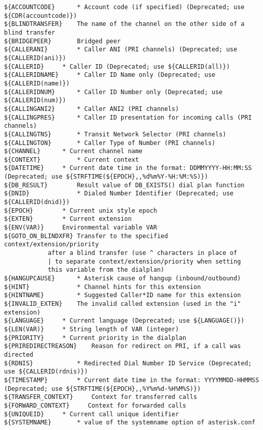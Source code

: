\begin{verbatim}
${ACCOUNTCODE} 	 	* Account code (if specified) (Deprecated; use ${CDR(accountcode)})
${BLINDTRANSFER} 	The name of the channel on the other side of a blind transfer
${BRIDGEPEER}	 	Bridged peer
${CALLERANI}	 	* Caller ANI (PRI channels) (Deprecated; use ${CALLERID(ani)})
${CALLERID}	 	* Caller ID (Deprecated; use ${CALLERID(all)})
${CALLERIDNAME}	 	* Caller ID Name only (Deprecated; use ${CALLERID(name)})
${CALLERIDNUM}	 	* Caller ID Number only (Deprecated; use ${CALLERID(num)})
${CALLINGANI2}	 	* Caller ANI2 (PRI channels)
${CALLINGPRES}	 	* Caller ID presentation for incoming calls (PRI channels)
${CALLINGTNS} 	 	* Transit Network Selector (PRI channels)
${CALLINGTON}    	* Caller Type of Number (PRI channels)
${CHANNEL}	 	* Current channel name
${CONTEXT}       	* Current context
${DATETIME}	 	* Current date time in the format: DDMMYYYY-HH:MM:SS (Deprecated; use ${STRFTIME(${EPOCH},,%d%m%Y-%H:%M:%S)})
${DB_RESULT}		Result value of DB_EXISTS() dial plan function
${DNID}          	* Dialed Number Identifier (Deprecated; use ${CALLERID(dnid)})
${EPOCH}	 	* Current unix style epoch
${EXTEN}	 	* Current extension
${ENV(VAR)}	 	Environmental variable VAR
${GOTO_ON_BLINDXFR}	Transfer to the specified context/extension/priority
			after a blind transfer (use ^ characters in place of
			| to separate context/extension/priority when setting
			this variable from the dialplan)
${HANGUPCAUSE}	 	* Asterisk cause of hangup (inbound/outbound)
${HINT}          	* Channel hints for this extension
${HINTNAME}      	* Suggested Caller*ID name for this extension
${INVALID_EXTEN} 	The invalid called extension (used in the "i" extension)
${LANGUAGE}	 	* Current language (Deprecated; use ${LANGUAGE()})
${LEN(VAR)}	 	* String length of VAR (integer)
${PRIORITY}	 	* Current priority in the dialplan
${PRIREDIRECTREASON} 	Reason for redirect on PRI, if a call was directed
${RDNIS}         	* Redirected Dial Number ID Service (Deprecated; use ${CALLERID(rdnis)})
${TIMESTAMP}	 	* Current date time in the format: YYYYMMDD-HHMMSS (Deprecated; use ${STRFTIME(${EPOCH},,%Y%m%d-%H%M%S)})
${TRANSFER_CONTEXT} 	Context for transferred calls
${FORWARD_CONTEXT}     Context for forwarded calls
${UNIQUEID}	 	* Current call unique identifier
${SYSTEMNAME}		* value of the systemname option of asterisk.conf
\end{verbatim}

